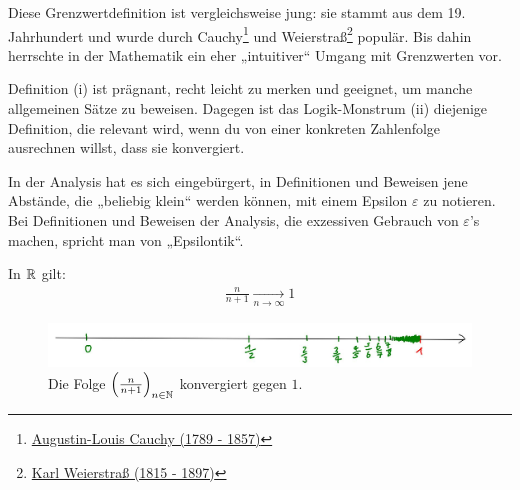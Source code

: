 \begin{bem} 
    Diese Grenzwertdefinition ist vergleichsweise jung: sie stammt aus dem 19. Jahrhundert und wurde durch Cauchy\footnote{\href{https://de.wikipedia.org/wiki/Augustin-Louis_Cauchy}{Augustin-Louis Cauchy (1789 - 1857)}} und Weierstraß\footnote{\href{https://de.wikipedia.org/wiki/Karl_Weierstra\%C3\%9F}{Karl Weierstraß (1815 - 1897)}} populär. Bis dahin herrschte in der Mathematik ein eher „intuitiver“ Umgang mit Grenzwerten vor.
    
    Definition (i) ist prägnant, recht leicht zu merken und geeignet, um manche allgemeinen Sätze zu beweisen. Dagegen ist das Logik-Monstrum (ii) diejenige Definition, die relevant wird, wenn du von einer konkreten Zahlenfolge ausrechnen willst, dass sie konvergiert.
    
    In der Analysis hat es sich eingebürgert, in Definitionen und Beweisen jene Abstände, die „beliebig klein“ werden können, mit einem Epsilon $\varepsilon$ zu notieren. Bei Definitionen und Beweisen der Analysis, die exzessiven Gebrauch von $\varepsilon$'s machen, spricht man von „Epsilontik“.
\end{bem}


\begin{bsp} \label{bsp:konvergenz}
    In $\mathbb R$ gilt:
    \begin{align*}
        \frac{n}{n+1} \xrightarrow[n\to\infty]{} 1
    \end{align*}
\end{bsp}


\begin{figure}[ht]
    \includegraphics[width=14cm]{./_img/Konvergenzbsp.jpeg}
    \centering \caption{Die Folge $\left(\frac{n}{n+1}\right)_{n\in \mathbb N}$ konvergiert gegen $1$.}
\end{figure}


